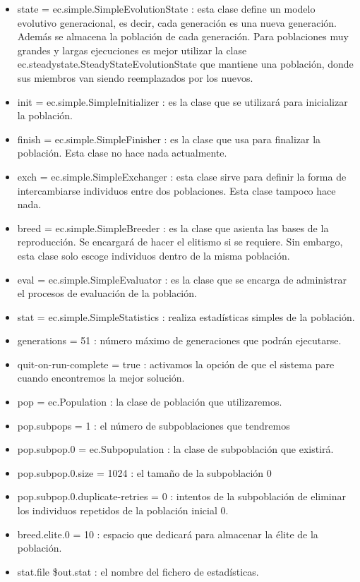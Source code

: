 \begin{itemize}
\item	state = ec.simple.SimpleEvolutionState : esta clase define un modelo evolutivo generacional, es decir, cada generación es una nueva generación. Además se almacena la población de cada generación. Para poblaciones muy grandes y largas ejecuciones es mejor utilizar la clase  ec.steadystate.SteadyStateEvolutionState que mantiene una población, donde sus miembros van siendo reemplazados por los nuevos.
\item	init = 	ec.simple.SimpleInitializer : es la clase que se utilizará para inicializar la población.
\item	finish = ec.simple.SimpleFinisher :  es la clase que usa para finalizar
la población. Esta clase no hace nada actualmente.
\item	exch = ec.simple.SimpleExchanger : esta clase sirve para definir la forma
de intercambiarse individuos entre dos poblaciones. Esta clase tampoco hace nada.
\item	breed = ec.simple.SimpleBreeder : es la clase que asienta las bases de la reproducción. Se encargará de hacer el elitismo si se requiere. Sin embargo, esta clase solo escoge individuos dentro de la misma población.
\item	eval =	ec.simple.SimpleEvaluator :  es la clase que se encarga de administrar el procesos de evaluación de la población.
\item	stat =	ec.simple.SimpleStatistics : realiza estadísticas simples de la población.
\item	generations = 51 : número máximo de generaciones que podrán ejecutarse.
\item	quit-on-run-complete = true : activamos la opción de que el sistema pare cuando encontremos la mejor solución.
\item	pop = 	ec.Population : la clase de población que utilizaremos.
\item	pop.subpops = 1 : el número de subpoblaciones que tendremos
\item	pop.subpop.0 = ec.Subpopulation : la clase de subpoblación que existirá.
\item	pop.subpop.0.size =	1024 : el tamaño de la subpoblación 0
\item	pop.subpop.0.duplicate-retries = 0 : intentos de la subpoblación de eliminar los individuos repetidos de la población inicial 0.
\item	breed.elite.0 = 10 : espacio que dedicará para almacenar la élite de la población.
\item	stat.file \$out.stat : el nombre del fichero de estadísticas.
\end{itemize}

